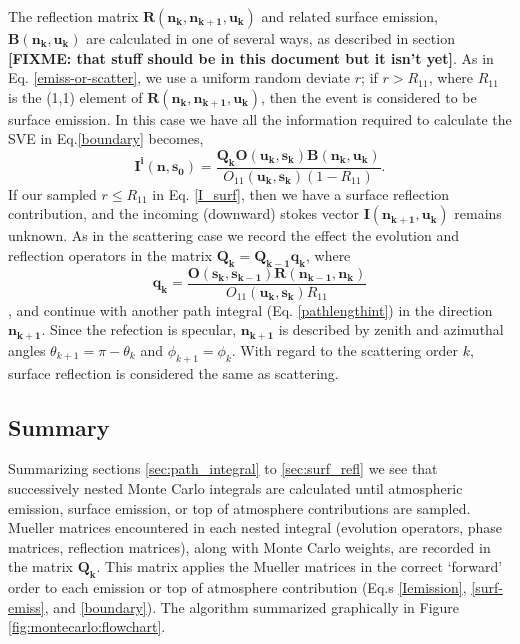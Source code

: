 The reflection matrix $\mathbf{R(n_k,n_{k+1},u_k)}$ and related surface emission, $\mathbf{B(n_k,u_k)}$ are calculated in one of several ways, as described in section {\bf[FIXME: that stuff should be in this document but it isn't yet]}.  As in Eq. \ref{emiss-or-scatter}, we use a uniform random deviate $r$; if
$r>R_{11}$, where $R_{11}$ is the (1,1) element of $\mathbf{R(n_k,n_{k+1},u_k)}$, then the event is considered to be surface emission.  In
this case we have all the information required to calculate the SVE in Eq.\ref{boundary} becomes, 
\begin{equation}
\mathbf{I^i(n,s_0)}=\frac{\mathbf{Q_k}\mathbf{O(u_k,s_k)B(n_k,u_k)}}{O_{11}(\mathbf{u_{k},s_k})(1-R_{11})}.
\label{surf-emiss}
\end{equation}
If our sampled $r \le R_{11}$ in Eq. \ref{I_surf}, then we have a surface reflection contribution, and the incoming (downward) stokes vector $\mathbf{I(n_{k+1},u_k)}$ remains unknown.  As in the scattering case we record the effect the evolution and reflection operators in the matrix $\mathbf{Q_k}=\mathbf{Q_{k-1}q_k}$, where
\begin{equation}
\mathbf{q_k}=\frac{\mathbf{O(s_k,s_{k-1})}\mathbf{R(n_{k-1},n_k)}}
  {O_{11}(\mathbf{u_{k},s_k})R_{11}}
\end{equation}
, and continue with another path integral (Eq. \ref{pathlengthint}) in the direction $\mathbf{n_{k+1}}$.
Since the refection is specular, $\mathbf{n_{k+1}}$ is described by zenith and azimuthal angles $\theta_{k+1}=\pi-\theta_k$ and $\phi_{k+1}=\phi_k$.  With regard to the scattering order $k$, surface reflection is considered the same as scattering.

\subsection{Summary}

Summarizing sections \ref{sec:path_integral} to \ref{sec:surf_refl} we see that successively nested Monte Carlo integrals are calculated until atmospheric emission, surface emission, or top of atmosphere contributions are sampled.  Mueller matrices encountered in each nested integral (evolution operators, phase matrices, reflection matrices), along with Monte Carlo weights, are recorded in the matrix $\mathbf{Q_k}$.  This matrix applies the Mueller matrices in the correct `forward' order to each emission or top of atmosphere contribution (Eq.s \ref{Iemission}, \ref{surf-emiss}, and \ref{boundary}).  The algorithm summarized graphically in Figure \ref{fig:montecarlo:flowchart}. 

